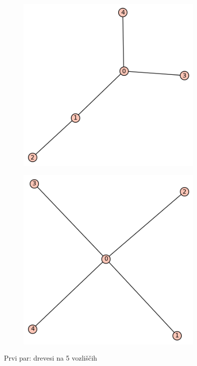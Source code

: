 \documentclass[12pt, a4paper]{article}
\begin{document}
\begin{center}
\begin{center}
\begin{figure}[!htb]
\centering
\begin{subfigure}{0.5\textwidth}
  \centering
  \includegraphics[width=0.4\linewidth]{t-6}
\end{subfigure}%
\begin{subfigure}{0.5\textwidth}
  \centering
  \includegraphics[width=0.5\linewidth]{t-7}
\end{subfigure}
\caption{Prvi par: drevesi na 5 vozliščih}
\label{fig:test}
\end{figure}
\end{center}


\end{center}
\end{document}
